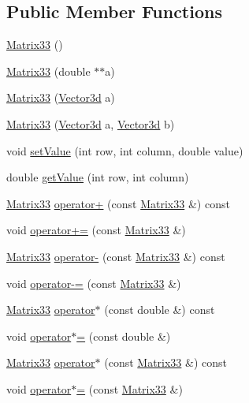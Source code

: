 \subsection*{Public Member Functions}
\begin{DoxyCompactItemize}
\item 
\hyperlink{classMatrix33_a70acb6647b172d017cc4265a29a7d263}{Matrix33} ()
\item 
\hyperlink{classMatrix33_a4399c6da8f1ac31ce514550282c823cf}{Matrix33} (double $\ast$$\ast$a)
\item 
\hyperlink{classMatrix33_a1f070a29a710043c38b56cee8214e6f7}{Matrix33} (\hyperlink{classVector3d}{Vector3d} a)
\item 
\hyperlink{classMatrix33_a7f1deae895c26e47c39c76bfaa31d3d2}{Matrix33} (\hyperlink{classVector3d}{Vector3d} a, \hyperlink{classVector3d}{Vector3d} b)
\item 
void \hyperlink{classMatrix33_a6cdcec77fd089b2e73ad7ae85ecff30b}{set\-Value} (int row, int column, double value)
\item 
double \hyperlink{classMatrix33_a849bbdf7b456ddacf7185b087fca4015}{get\-Value} (int row, int column)
\item 
\hyperlink{classMatrix33}{Matrix33} \hyperlink{classMatrix33_adc58ec5739c9250ff1150c725d0e868e}{operator+} (const \hyperlink{classMatrix33}{Matrix33} \&) const 
\item 
void \hyperlink{classMatrix33_acb59e59d3937e075521f478ba83b7165}{operator+=} (const \hyperlink{classMatrix33}{Matrix33} \&)
\item 
\hyperlink{classMatrix33}{Matrix33} \hyperlink{classMatrix33_a372f71ec208bb6d3045acd4324b7cb06}{operator-\/} (const \hyperlink{classMatrix33}{Matrix33} \&) const 
\item 
void \hyperlink{classMatrix33_abc889e10a9c7c532195c7031c1344a74}{operator-\/=} (const \hyperlink{classMatrix33}{Matrix33} \&)
\item 
\hyperlink{classMatrix33}{Matrix33} \hyperlink{classMatrix33_a6992fd2bb0b6e9ad71b5d3481c4e3e1a}{operator$\ast$} (const double \&) const 
\item 
void \hyperlink{classMatrix33_a83162791813bef030b1ceb5df3c5cae3}{operator$\ast$=} (const double \&)
\item 
\hyperlink{classMatrix33}{Matrix33} \hyperlink{classMatrix33_a525f14614255ff81c0cbab8060e8e065}{operator$\ast$} (const \hyperlink{classMatrix33}{Matrix33} \&) const 
\item 
void \hyperlink{classMatrix33_ac3937bdeb034cc83b4adcad16cd58a26}{operator$\ast$=} (const \hyperlink{classMatrix33}{Matrix33} \&)
$$
\end{DoxyCompactItemize}
